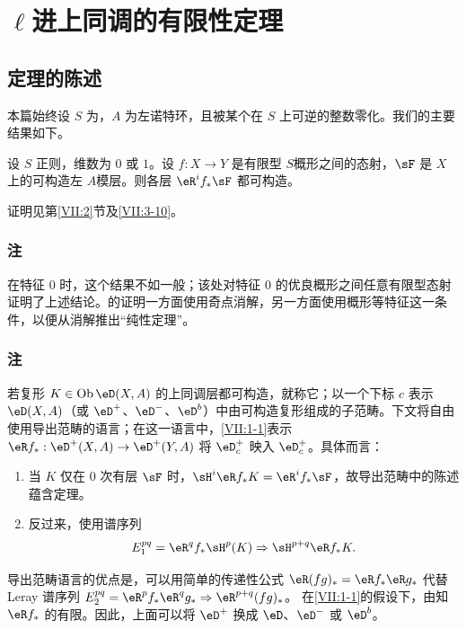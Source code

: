 \chapter{$\ell$进上同调的有限性定理}\label{VII}
\section{定理的陈述}\label{VII:1}
本篇始终设 $S$ 为，$A$ 为左诺特环，且被某个在 $S$ 上可逆的整数零化。我们的主要结果如下。
\begin{theorem_}\label{VII:1-1}
设 $S$ 正则，维数为 $0$ 或 $1$。设 $f:X\to Y$ 是有限型 $S$概形之间的态射，$\sF$ 是 $X$ 上的可构造左 $A$模层。则各层 $\eR^i f_\ast\sF$ 都可构造。
\end{theorem_}
证明见第\ref{VII:2}节及\ref{VII:3-10}。
\subsection{注}\label{VII:1-2}
在特征 $0$ 时，这个结果不如\cite[XIX，第5节]{sga4}一般；该处对特征 $0$ 的优良概形之间任意有限型态射证明了上述结论。\cite[XIX]{sga4}的证明一方面使用奇点消解，另一方面使用概形等特征这一条件，以便从消解推出“纯性定理”。
\subsection{注}\label{VII:1-3}
若复形 $K\in\ob\eD(X,A)$ 的上同调层都可构造，就称它；以一个下标 $c$ 表示 $\eD(X,A)$（或 $\eD^+$、$\eD^-$、$\eD^b$）中由可构造复形组成的子范畴。下文将自由使用导出范畴的语言；在这一语言中，\ref{VII:1-1}表示 $\eR f_\ast:\eD^+(X,A)\to\eD^+(Y,A)$ 将 $\eD_c^+$ 映入 $\eD_c^+$。具体而言：
\begin{enumerate}[\indent a)]
\item 当 $K$ 仅在 $0$ 次有层 $\sF$ 时，$\sH^i\eR f_\ast K=\eR^i f_\ast\sF$，故导出范畴中的陈述蕴含定理。
\item 反过来，使用谱序列
\[
 E_1^{p q}=\eR^q f_\ast\sH^p(K)\Rightarrow\sH^{p+q}\eR f_\ast K.
\]
\end{enumerate}
导出范畴语言的优点是，可以用简单的传递性公式 $\eR(fg)_\ast=\eR f_\ast\eR g_\ast$ 代替 Leray 谱序列
$E_2^{pq}=\eR^p f_\ast\eR^q g_\ast\Rightarrow\eR^{p+q}(fg)_\ast$。
在\ref{VII:1-1}的假设下，由\cite[X]{sga4}知 $\eR f_\ast$ 的有限。因此，上面可以将 $\eD^+$ 换成 $\eD$、$\eD^-$ 或 $\eD^b$。
